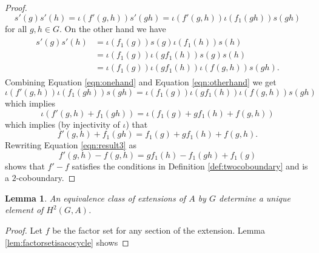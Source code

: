 \documentclass{dcthesis}
\newcommand{\mm}[1]{{\color{blue} \sf MM: [#1]}}
\numberwithin{equation}{section}
\newtheorem{lemma}[equation]{Lemma}
\theoremstyle{definition}
\theoremstyle{remark}
\begin{document}
{{\begin{proof}
\begin{equation}
        \label{eqn:onehand}
        s'(g)s'(h)=
        \iota(f'(g,h))s'(gh)=
        \iota(f'(g,h))\iota(f_1(gh))s(gh)
      \end{equation}
      for all $g,h\in G$.
      On the other hand we have
      \begin{align}
        \label{eqn:otherhand}
        \begin{split}
          s'(g)s'(h)
          &=\iota(f_1(g))s(g)\iota(f_1(h))s(h)\\
          &=\iota(f_1(g))\iota(gf_1(h))s(g)s(h)\\
          &=\iota(f_1(g))\iota(gf_1(h))\iota(f(g,h))s(gh).
        \end{split}
      \end{align}
      Combining Equation \ref{eqn:onehand}
      and
      Equation \ref{eqn:otherhand}
      we get
      \begin{equation}
        \label{eqn:result1}
        \iota(f'(g,h))\iota(f_1(gh))s(gh)
        =\iota(f_1(g))\iota(gf_1(h))\iota(f(g,h))s(gh)
      \end{equation}
      which implies
      \begin{equation}
        \label{eqn:result2}
        \iota(f'(g,h)+f_1(gh))
        =\iota(f_1(g)+gf_1(h)+f(g,h))
      \end{equation}
      which implies (by injectivity of $\iota$)
      that
      \begin{equation}
        \label{eqn:result3}
        f'(g,h)+f_1(gh)
        =f_1(g)+gf_1(h)+f(g,h).
      \end{equation}
      Rewriting Equation \ref{eqn:result3} as
      \begin{equation}
        \label{eqn:result4}
        f'(g,h)-f(g,h)=gf_1(h)-f_1(gh)+f_1(g)
      \end{equation}
      shows that $f'-f$ satisfies
      the conditions in
      Definition \ref{def:twocoboundary}
      and is a $2$-coboundary.
    \end{proof}
    \begin{lemma}
      \label{lem:equivalentextensionssamecohomologyclass}
      An equivalence class of extensions of $A$ by $G$
      determine a unique element of
      $H^2(G,A)$.
    \end{lemma}
    \begin{proof}
      Let $f$ be the factor set for
      any section of the extension.
      Lemma \ref{lem:factorsetisacocycle} shows

\end{proof}}}
\end{document}
